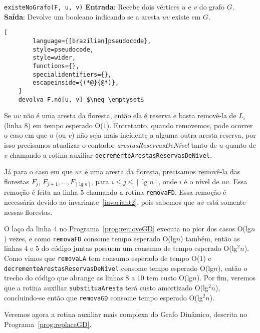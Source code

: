 \begin{programruledcaption}{\texttt{existeNoGrafo(F, u, v)} \label{prog:existGD}}
    \noindent\textbf{Entrada}: Recebe dois vértices $u$ e $v$ do grafo $G$. \\
    \textbf{Saída}: Devolve um booleano indicando se a aresta $uv$ existe em $G$.
    \vspace{-0.5\baselineskip}
    \begin{lstlisting}[
        language={[brazilian]pseudocode},
        style=pseudocode,
        style=wider,
        functions={},
        specialidentifiers={},
        escapeinside={(*@}{@*)},
    ]
    devolva F.nó[u, v] $\neq \emptyset$ 
    \end{lstlisting}
    \vspace{-0.5\baselineskip}
\end{programruledcaption}

Se $uv$ não é uma aresta da floresta, então ela é reserva e basta removê-la de $L_i$ (linha $8$) em tempo esperado O($1$). Entretanto, quando removemos, pode ocorrer o caso em que $u$ (ou $v$) não seja mais incidente a alguma outra aresta reserva, por isso precisamos atualizar o contador \textit{arestasReservasDeNível} tanto de $u$ quanto de $v$ chamando a rotina auxiliar \texttt{decrementeArestasReservasDeNível}.

Já para o caso em que $uv$ é uma aresta da floresta, precisamos removê-la das florestas $F_j$, $F_{j+1}, \ldots, F_{\left\lceil \lg n \right\rceil}$, para $i \leq j \leq \left\lceil \lg n \right\rceil$, onde $i$ é o nível de $uv$. Essa remoção é feita na linha $5$ chamando a rotina \texttt{removaFD}. Essa remoção é necessária devido ao invariante~\ref{invariant2}, pois sabemos que $uv$ está somente nessas florestas. 

O laço da linha $4$ no Programa~\ref{prog:removeGD} executa no pior dos casos O(lg$n$) vezes, e como \texttt{removaFD} consome tempo esperado O(lg$n$) também, então as linhas $4$ e $5$ do código juntas possuem um consumo de tempo esperado O(lg$^2n$). Como vimos que \texttt{removaLA} tem consumo esperado de tempo O($1$) e \texttt{decrementeArestasReservasDeNível} consome tempo esperado O(lg$n$), então o trecho do código que abrange as linhas 8 a 10 tem custo O(lg$n$). Por fim, veremos que a rotina auxiliar \texttt{substituaAresta} terá custo amortizado O(lg$^2n$), concluindo-se então que \texttt{removaGD} consome tempo esperado O(lg$^2n$).

Veremos agora a rotina auxiliar mais complexa do Grafo Dinâmico, descrita no Programa~\ref{prog:replaceGD}.

